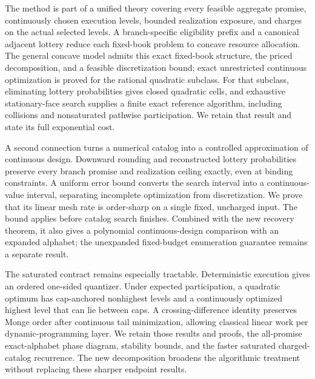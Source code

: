 The method is part of a unified theory covering every feasible aggregate promise, continuously chosen execution levels, bounded realization exposure, and charges on the actual selected levels. A branch-specific eligibility prefix and a canonical adjacent lottery reduce each fixed-book problem to concave resource allocation. The general concave model admits this exact fixed-book structure, the priced decomposition, and a feasible discretization bound; exact unrestricted continuous optimization is proved for the rational quadratic subclass. For that subclass, eliminating lottery probabilities gives closed quadratic cells, and exhaustive stationary-face search supplies a finite exact reference algorithm, including collisions and nonsaturated pathwise participation. We retain that result and state its full exponential cost.

A second connection turns a numerical catalog into a controlled approximation of continuous design. Downward rounding and reconstructed lottery probabilities preserve every branch promise and realization ceiling exactly, even at binding constraints. A uniform error bound converts the search interval into a continuous-value interval, separating incomplete optimization from discretization. We prove that its linear mesh rate is order-sharp on a single fixed, uncharged input. The bound applies before catalog search finishes. Combined with the new recovery theorem, it also gives a polynomial continuous-design comparison with an expanded alphabet; the unexpanded fixed-budget enumeration guarantee remains a separate result.

The saturated contract remains especially tractable. Deterministic execution gives an ordered one-sided quantizer. Under expected participation, a quadratic optimum has cap-anchored nonhighest levels and a continuously optimized highest level that can lie between caps. A crossing-difference identity preserves Monge order after continuous tail minimization, allowing classical linear work per dynamic-programming layer. We retain those results and proofs, the all-promise exact-alphabet phase diagram, stability bounds, and the faster saturated charged-catalog recurrence. The new decomposition broadens the algorithmic treatment without replacing these sharper endpoint results.

